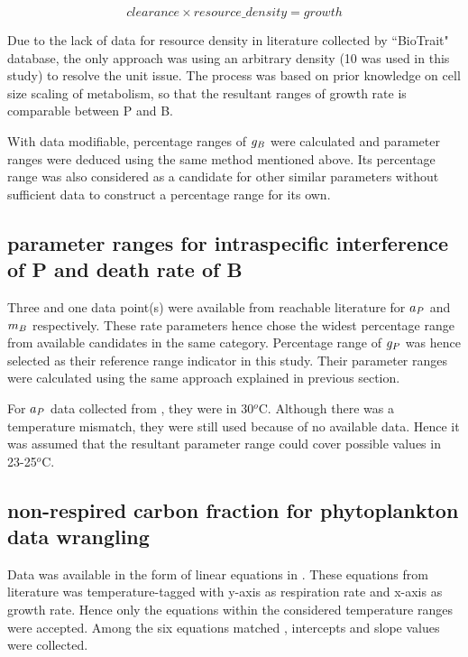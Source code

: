 \documentclass[../thesis.tex]{subfiles} %
\begin{document}
\begin{equation}
    clearance \times resource\_density = growth
    \label{eq:gB}
\end{equation}

Due to the lack of data for resource density in literature collected by ``BioTrait" database\autocite{della2013thermal}, the only approach was using an arbitrary density (10 was used in this study) to resolve the unit issue.  The process was based on prior knowledge on cell size scaling of metabolism, so that the resultant ranges of growth rate is comparable between P and B.

With data modifiable, percentage ranges of $g_B$ were calculated and parameter ranges were deduced using the same method mentioned above.  Its percentage range was also considered as a candidate for other similar parameters without sufficient data to construct a percentage range for its own.

\subsection{parameter ranges for intraspecific interference of P and death rate of B}
Three and one data point(s) were available from reachable literature for $a_P$ \autocite{de2007biofixation} and $m_B$ \autocite{cochran1988estimation} respectively.  These rate parameters hence chose the widest percentage range from available candidates in the same category.  Percentage range of $g_P$ was hence selected as their reference range indicator in this study.  Their parameter ranges were calculated using the same approach explained in previous section.

For $a_P$ data collected from \autocite{de2007biofixation}, they were in 30$^o$C.  Although there was a temperature mismatch, they were still used because of no available data.  Hence it was assumed that the resultant parameter range could cover possible values in 23-25$^o$C.

\subsection{non-respired carbon fraction for phytoplankton data wrangling}
Data was available in the form of linear equations in \autocite{j1989respiration}.  These equations from literature was temperature-tagged with y-axis as respiration rate and x-axis as growth rate.  Hence only the equations within the considered temperature ranges were accepted.  Among the six equations matched , intercepts and slope values were collected.
\end{document}

